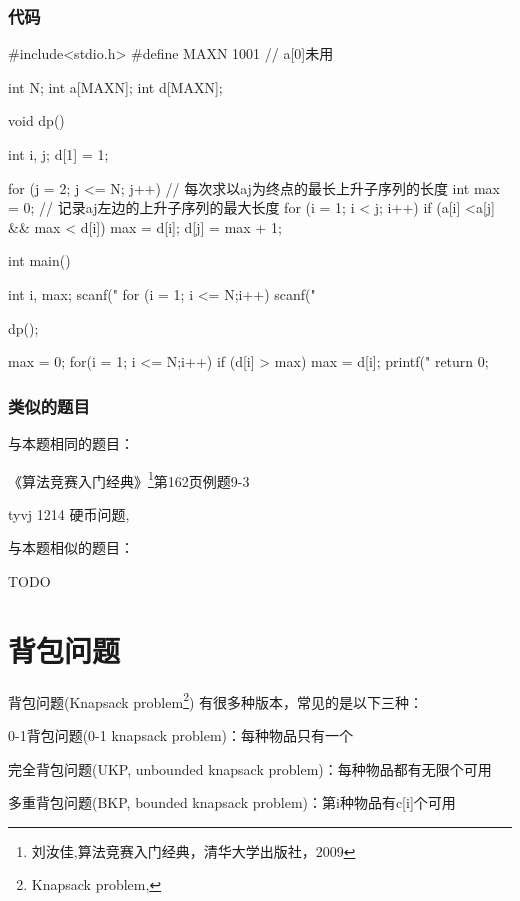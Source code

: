 \subsubsection{代码}

\begin{Codex}[label=lis.c]
#include<stdio.h>
#define MAXN 1001 // a[0]未用

int N;
int a[MAXN];
int d[MAXN];

void dp() {
    int i, j;
    d[1] = 1;
 
    for (j = 2; j <= N; j++) { // 每次求以aj为终点的最长上升子序列的长度
        int max = 0;  // 记录aj左边的上升子序列的最大长度 
        for (i = 1; i < j; i++)  if (a[i] <a[j] && max < d[i]) max = d[i];
        d[j] = max + 1;
    }
}

int main() {
    int i, max;
    scanf("%
    for (i = 1; i <= N;i++) scanf("%
    
    dp();

    max = 0;
    for(i = 1; i <= N;i++) if (d[i] > max) max = d[i];
    printf("%
    return 0;
}
\end{Codex}

\subsubsection{类似的题目}
与本题相同的题目：
\begindot
\item 《算法竞赛入门经典》\footnote{刘汝佳,算法竞赛入门经典，清华大学出版社，2009}第162页例题9-3
\item  tyvj 1214 硬币问题, 
\myenddot

与本题相似的题目：
\begindot
\item  TODO
\myenddot

\section{背包问题} %
背包问题(Knapsack problem\footnote{Knapsack problem, })
有很多种版本，常见的是以下三种：
\begindot
\item 0-1背包问题(0-1 knapsack problem)：每种物品只有一个
\item 完全背包问题(UKP, unbounded knapsack problem)：每种物品都有无限个可用
\item 多重背包问题(BKP, bounded knapsack problem)：第i种物品有c[i]个可用
\myenddot

